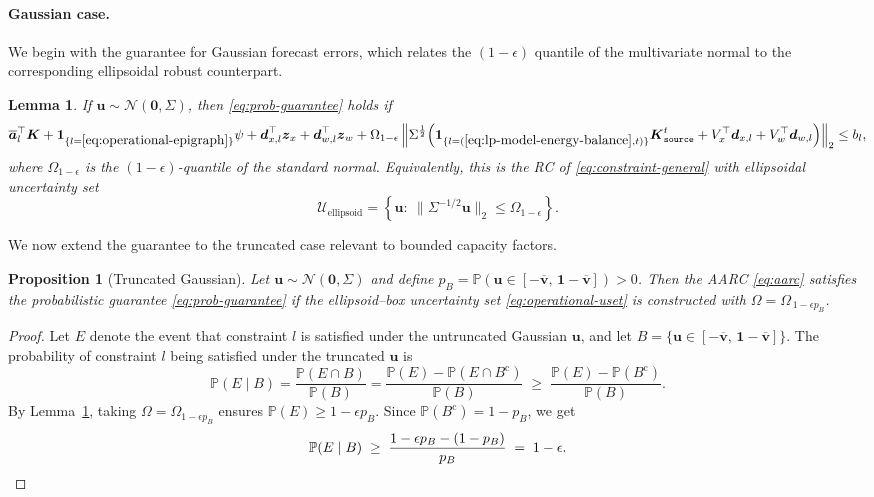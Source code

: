 \documentclass[11pt, letter]{article}
\newtheorem{proposition}[theorem]{Proposition}
\newtheorem{lemma}[theorem]{Lemma}
\begin{document}
\paragraph{Gaussian case.}
We begin with the guarantee for Gaussian forecast errors, 
which relates the $(1-\epsilon)$ quantile of the multivariate normal 
to the corresponding ellipsoidal robust counterpart.
\begin{lemma}\label{lemma:gaussian}
    If $\boldsymbol{u}\sim\mathcal N(\boldsymbol{0},\Sigma)$, then 
\eqref{eq:prob-guarantee} holds if
\begin{equation}
\overline{\boldsymbol{a}}_l^\top \boldsymbol{K} 
+ \mathbf{1}_{\{l=\eqref{eq:operational-epigraph}\}} \psi 
+ \boldsymbol{d}_{x,l}^\top \boldsymbol{z}_x 
+ \boldsymbol{d}_{w,l}^\top \boldsymbol{z}_w  +
 \Omega_{1-\epsilon} \left\| \Sigma^{\frac12} \Big( 
   \mathbf{1}_{\{l=(\eqref{eq:lp-model-energy-balance},t)\}} \boldsymbol{K}_{\texttt{source}}^t  
   + V_x^\top \boldsymbol{d}_{x,l} 
   + V_w^\top \boldsymbol{d}_{w,l} 
\Big) \right\|_2 \le b_l , 
\end{equation}
where $\Omega_{1-\epsilon}$ is the $(1-\epsilon)$-quantile of the standard normal. 
Equivalently, this is the RC of \eqref{eq:constraint-general} with ellipsoidal uncertainty set
\[
\mathcal U_\text{ellipsoid}=\left\{\boldsymbol{u}:\ 
\bigl\|\Sigma^{-1/2}\boldsymbol{u}\bigr\|_2 \le \Omega_{1-\epsilon}\right\}.
\]
\end{lemma}
We now extend the guarantee to the truncated case relevant to bounded capacity factors.
\begin{proposition}[Truncated Gaussian]\label{prop:trunc-gauss}
Let $\boldsymbol{u}\sim\mathcal N(\boldsymbol{0},\Sigma)$ and define 
$p_{B}=\mathbb{P}(\boldsymbol{u}\in[-\boldsymbol{\overline v},\,\boldsymbol{1}-\boldsymbol{\overline v}])>0$.
Then the AARC \eqref{eq:aarc} satisfies the probabilistic guarantee \eqref{eq:prob-guarantee}
if the ellipsoid–box uncertainty set \eqref{eq:operational-uset} is constructed with 
$\Omega=\Omega_{\,1-\epsilon p_{B}}$.
\end{proposition}

\begin{proof}
Let $E$ denote the event that constraint $l$ is satisfied under the untruncated Gaussian $\boldsymbol{u}$, and let $B=\{\boldsymbol{u}\in[-\boldsymbol{\overline v},\,\boldsymbol{1}-\boldsymbol{\overline v}]\}$. The probability of constraint $l$ being satisfied under the truncated $\boldsymbol{u}$ is
\[
\mathbb{P}(E\mid B)
=\frac{\mathbb{P}(E\cap B)}{\mathbb{P}(B)}=\frac{\mathbb{P}(E) -\mathbb{P}(E\cap B^{\mathrm c})}{\mathbb{P}(B)}
\;\ge\;\frac{\mathbb{P}(E)-\mathbb{P}(B^{\mathrm c})}{\mathbb{P}(B)}.
\]
By Lemma~\ref{lemma:gaussian}, taking
$\Omega=\Omega_{1-\epsilon p_B}$ ensures $\mathbb{P}(E)\ge 1-\epsilon p_B$. Since
$\mathbb{P}(B^{\mathrm c})=1-p_B$, we get
\[
\mathbb{P}(E\mid B)
\;\ge\;\frac{1-\epsilon p_B-(1-p_B)}{p_B}
\;=\;1-\epsilon. \qedhere
\]
\end{proof}
\end{document}
